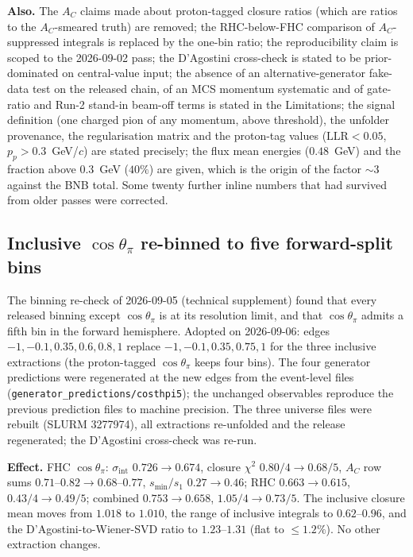 \textbf{Also.} The $A_C$ claims made about proton-tagged closure ratios (which are ratios to
the $A_C$-smeared truth) are removed; the RHC-below-FHC comparison of $A_C$-suppressed
integrals is replaced by the one-bin ratio; the reproducibility claim is scoped to the
2026-09-02 pass; the D'Agostini cross-check is stated to be prior-dominated on
central-value input; the absence of an alternative-generator fake-data test on the
released chain, of an MCS momentum systematic and of gate-ratio and Run-2 stand-in
beam-off terms is stated in the Limitations; the signal definition (one charged pion of
any momentum, above threshold), the unfolder provenance, the regularisation matrix and
the proton-tag values ($\mathrm{LLR}<0.05$, $p_p>0.3$~GeV/$c$) are stated precisely; the
flux mean energies ($0.48$~GeV) and the fraction above $0.3$~GeV ($40\%$) are given, which
is the origin of the factor $\sim\!3$ against the BNB total. Some twenty further inline
numbers that had survived from older passes were corrected.

\subsection{Inclusive $\cos\theta_\pi$ re-binned to five forward-split bins}

The binning re-check of 2026-09-05 (technical supplement) found that every released binning
except $\cos\theta_\pi$ is at its resolution limit, and that $\cos\theta_\pi$ admits a fifth
bin in the forward hemisphere. Adopted on 2026-09-06: edges $-1,-0.1,0.35,0.6,0.8,1$
replace $-1,-0.1,0.35,0.75,1$ for the three inclusive extractions (the proton-tagged
$\cos\theta_\pi$ keeps four bins). The four generator predictions were regenerated at the
new edges from the event-level files (\texttt{generator\_predictions/costhpi5}); the
unchanged observables reproduce the previous prediction files to machine precision. The
three universe files were rebuilt (SLURM 3277974), all extractions re-unfolded and the
release regenerated; the D'Agostini cross-check was re-run.

\textbf{Effect.} FHC $\cos\theta_\pi$: $\sigma_\mathrm{int}$ $0.726\to0.674$, closure
$\chi^2$ $0.80/4\to0.68/5$, $A_C$ row sums $0.71$--$0.82\to0.68$--$0.77$,
$s_{\min}/s_1$ $0.27\to0.46$; RHC $0.663\to0.615$, $0.43/4\to0.49/5$; combined
$0.753\to0.658$, $1.05/4\to0.73/5$. The inclusive closure mean moves from $1.018$ to
$1.010$, the range of inclusive integrals to $0.62$--$0.96$, and the D'Agostini-to-Wiener-SVD
ratio to $1.23$--$1.31$ (flat to $\le1.2\%$). No other extraction changes.

